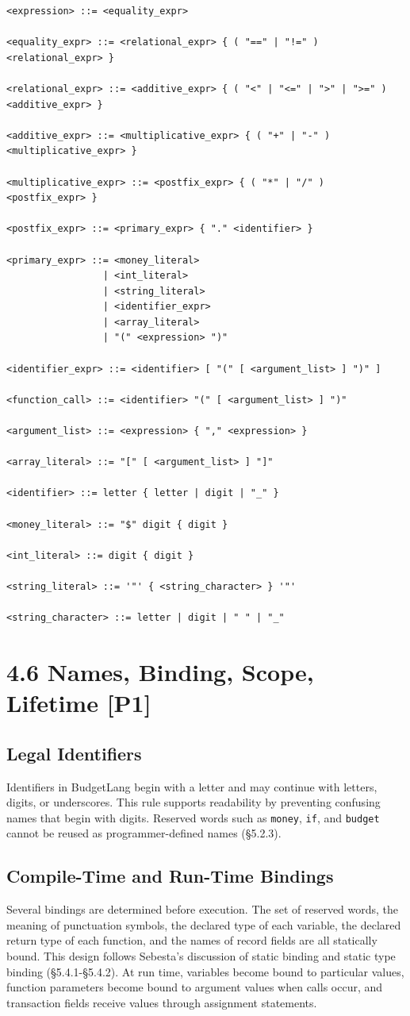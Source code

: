 \documentclass[11pt]{article}
\begin{document}
\begin{verbatim}
<expression> ::= <equality_expr>

<equality_expr> ::= <relational_expr> { ( "==" | "!=" ) <relational_expr> }

<relational_expr> ::= <additive_expr> { ( "<" | "<=" | ">" | ">=" ) <additive_expr> }

<additive_expr> ::= <multiplicative_expr> { ( "+" | "-" ) <multiplicative_expr> }

<multiplicative_expr> ::= <postfix_expr> { ( "*" | "/" ) <postfix_expr> }

<postfix_expr> ::= <primary_expr> { "." <identifier> }

<primary_expr> ::= <money_literal>
                 | <int_literal>
                 | <string_literal>
                 | <identifier_expr>
                 | <array_literal>
                 | "(" <expression> ")"

<identifier_expr> ::= <identifier> [ "(" [ <argument_list> ] ")" ]

<function_call> ::= <identifier> "(" [ <argument_list> ] ")"

<argument_list> ::= <expression> { "," <expression> }

<array_literal> ::= "[" [ <argument_list> ] "]"

<identifier> ::= letter { letter | digit | "_" }

<money_literal> ::= "$" digit { digit }

<int_literal> ::= digit { digit }

<string_literal> ::= '"' { <string_character> } '"'

<string_character> ::= letter | digit | " " | "_"
\end{verbatim}

\section*{4.6 Names, Binding, Scope, Lifetime [P1]}
\subsection*{Legal Identifiers}
Identifiers in BudgetLang begin with a letter and may continue with letters, digits, or underscores. This rule supports readability by preventing confusing names that begin with digits. Reserved words such as \texttt{money}, \texttt{if}, and \texttt{budget} cannot be reused as programmer-defined names (\S5.2.3).

\subsection*{Compile-Time and Run-Time Bindings}
Several bindings are determined before execution. The set of reserved words, the meaning of punctuation symbols, the declared type of each variable, the declared return type of each function, and the names of record fields are all statically bound. This design follows Sebesta's discussion of static binding and static type binding (\S5.4.1-\S5.4.2). At run time, variables become bound to particular values, function parameters become bound to argument values when calls occur, and transaction fields receive values through assignment statements.
\end{document}
